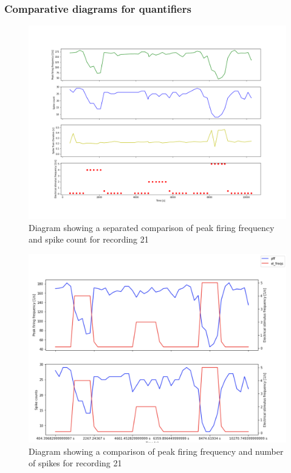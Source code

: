 \subsubsection{Comparative diagrams for quantifiers}
\begin{figure}
	\includegraphics[width = \textwidth]{src/pic/11_12_13_sp}
	\caption{Diagram showing a separated comparison of peak firing frequency and spike count for recording 21}
	\label{fig:quantcomp_sp}
\end{figure}
\begin{figure}
	\includegraphics[width = \textwidth]{src/pic/11_12_13_cm}
	\caption{Diagram showing a comparison of peak firing frequency and number of spikes for recording 21}
	\label{fig:quantcomp_cm}
\end{figure}



